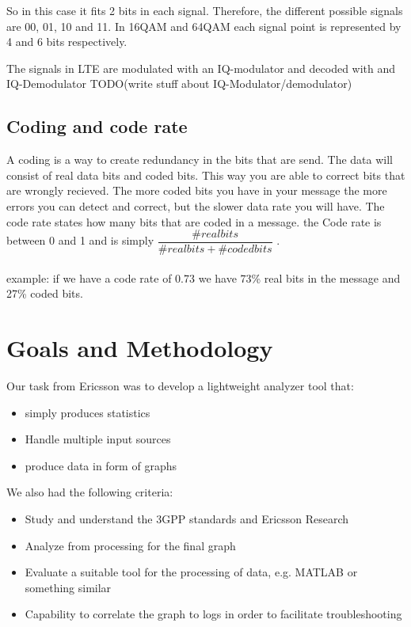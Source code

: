 \documentclass[cropmarks, frame, english]{idamasterthesis}
\begin{document}
 So in this case it fits 2 bits in each signal. Therefore, the different possible signals are 00, 01, 10 and 11. In 16QAM and 64QAM each signal point is represented by 4 and 6 bits respectively.

The signals in LTE are modulated with an IQ-modulator and decoded with and IQ-Demodulator 
TODO(write stuff about IQ-Modulator/demodulator)

\subsection{Coding and code rate}
A coding is a way to create redundancy in the bits that are send. The data will consist of real data bits and coded bits. This way you are able to correct bits that are wrongly recieved. The more coded bits you have in your message the more errors you can detect and correct, but the slower data rate you will have. The code rate states how many bits that are coded in a message. the Code rate is between 0 and 1 and is simply $\dfrac{\# real bits}{ \# real bits + \# coded bits}$ . 
\\ \\
example: if we have a code rate of 0.73 we have 73\% real bits in the message and 27\% coded bits. 


\section{Goals and Methodology}

Our task from Ericsson was to develop a lightweight analyzer tool that:

 \begin{itemize} 
 \item simply produces statistics
 \item Handle multiple input sources
 \item produce data in form of graphs
 \end{itemize} 

\setlength{\parindent}{0cm} We also had the following criteria: 
 
 \begin{itemize} 
 \item Study and understand the 3GPP standards and Ericsson Research
 \item Analyze from processing for the final graph
 \item Evaluate a suitable tool for the processing of data, e.g. MATLAB or something similar
 \item Capability to correlate the graph to logs in order to facilitate troubleshooting
 \end{itemize}
\end{document}
